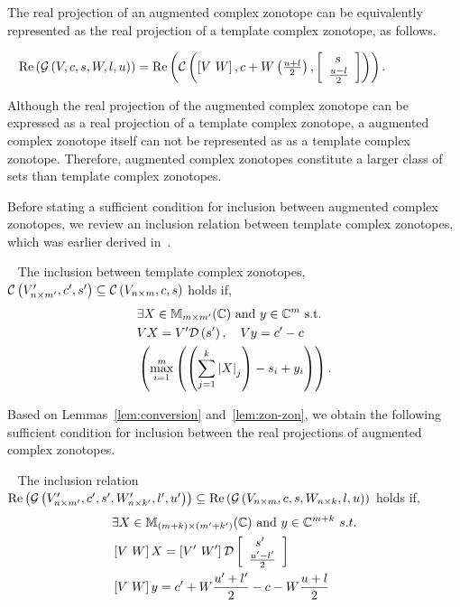 


The real projection of an augmented complex zonotope can be
equivalently represented as the real projection of a template complex
zonotope, as follows.  
\begin{lemma}~\label{lem:conversion}
$\real\lt(\gcz{V}{c}{s}{W}{l}{u}\rt) = \real\lt(\cz{\lt[V~W\rt]}{c+W\lt(\frac{u+l}{2}\rt)}{\ColumnJoin{\hspace{0.5em}s}{\frac{u-l}{2}}}\rt)$.
\end{lemma}
Although the real projection of the augmented complex zonotope can
be expressed as a real projection of a template complex zonotope, a
augmented complex zonotope itself can not be represented as as a
template complex zonotope.  Therefore, augmented complex zonotopes
constitute a larger class of sets than template complex zonotopes.

Before stating a sufficient condition for inclusion between augmented complex
zonotopes, we review an inclusion relation between template complex
zonotopes, which was earlier derived in~\cite{todo}.
\begin{lemma}~\label{lem:zon-zon} The inclusion between template complex zonotopes,
  $\cz{V^\pr_{n\times m^\pr}}{c^\pr}{s^\pr}\subseteq \cz{V_{n\times m}}{c}{s}$ holds if,
\begin{align}
\begin{split}
& \exists X\in\mat{m}{m^\pr}{\mb{C}}~\text{and}~y\in\mb{C}^{m}~\text{s.t.}\\
& \transfer{V}{V^\pr}{s^\pr}{X},~~~\centertransfer{V}{c}{c^\pr}{y}\\
& \lt(\scalebound{X}{y}{s}{m}{k}\rt).\\
\end{split}
\end{align}
\end{lemma}

Based on Lemmas~\ref{lem:conversion} and~\ref{lem:zon-zon}, we obtain
the following sufficient condition for inclusion between the real
projections of augmented complex zonotopes.
\begin{lemma}~\label{lem:gcz-gcz}
The inclusion relation
$\real\lt(\gcz{V^\pr_{n\times m^\pr}}{c^\pr}{s^\pr}{W^\pr_{n\times k^\pr}}{l^\pr}{u^\pr}\rt)\subseteq
\real\lt(\gcz{V_{n\times m}}{c}{s}{W_{n\times k}}{l}{u}\rt)$ holds if,
\begin{align}
\begin{split}
& \exists X\in\mat{(m+k)}{(m^\pr+k^\pr)}{\mb{C}}~\text{and}~y\in\mb{C}^{m+k}~s.t.\\
& \lt[V~W\rt]X = \lt[V^\pr~W^\pr\rt]\dg\ColumnJoin{\hspace{0.5em}s^\pr}{\frac{u^\pr-l^\pr}{2}}\\
& \lt[V~W\rt]y = c^\pr+W\frac{u^\pr+l^\pr}{2}-c-W\frac{u+l}{2}
\end{split}
\end{align}
\end{lemma}

